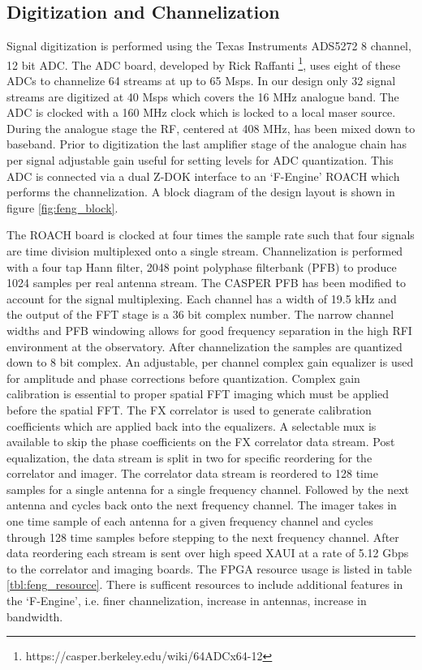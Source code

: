 \documentclass[useAMS,macros,usenatbib,onecolumn]{mn2e}
\begin{document}
\subsection{Digitization and Channelization}
\label{channelization}

Signal digitization is performed using the Texas Instruments ADS5272 8 channel, 12 bit ADC.
The ADC board, developed by Rick Raffanti \footnote{https://casper.berkeley.edu/wiki/64ADCx64-12}, uses eight of these ADCs to channelize 64 streams at up to 65 Msps.
In our design only 32 signal streams are digitized at 40 Msps which covers the 16 MHz analogue band.
The ADC is clocked with a 160 MHz clock which is locked to a local maser source.
During the analogue stage the RF, centered at 408 MHz, has been mixed down to baseband.
Prior to digitization the last amplifier stage of the analogue chain has per signal adjustable gain useful for setting levels for ADC quantization.
This ADC is connected via a dual Z-DOK interface to an `F-Engine' ROACH which performs the channelization.
A block diagram of the design layout is shown in figure \ref{fig:feng_block}.

The ROACH board is clocked at four times the sample rate such that four signals are time division multiplexed onto a single stream.
Channelization is performed with a four tap Hann filter, 2048 point polyphase filterbank (PFB) to produce 1024 samples per real antenna stream.
The CASPER PFB has been modified to account for the signal multiplexing.
Each channel has a width of 19.5 kHz and the output of the FFT stage is a 36 bit complex number.
The narrow channel widths and PFB windowing allows for good frequency separation in the high RFI environment at the observatory.
After channelization the samples are quantized down to 8 bit complex.
An adjustable, per channel complex gain equalizer is used for amplitude and phase corrections before quantization.
Complex gain calibration is essential to proper spatial FFT imaging which must be applied before the spatial FFT.
The FX correlator is used to generate calibration coefficients which are applied back into the equalizers.
A selectable mux is available to skip the phase coefficients on the FX correlator data stream.
Post equalization, the data stream is split in two for specific reordering for the correlator and imager.
The correlator data stream is reordered to 128 time samples for a single antenna for a single frequency channel.
Followed by the next antenna and cycles back onto the next frequency channel.
The imager takes in one time sample of each antenna for a given frequency channel and cycles through 128 time samples before stepping to the next frequency channel.
After data reordering each stream is sent over high speed XAUI at a rate of 5.12 Gbps to the correlator and imaging boards.
The FPGA resource usage is listed in table \ref{tbl:feng_resource}.
There is sufficent resources to include additional features in the `F-Engine', i.e. finer channelization, increase in antennas, increase in bandwidth.
\end{document}
